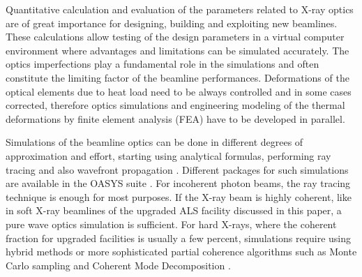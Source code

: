 \documentclass[preprint]{iucr}              %
\begin{document}
Quantitative calculation and evaluation of the parameters related to X-ray optics are of great importance for designing, building and exploiting new beamlines. These calculations allow testing of the design parameters in a virtual computer environment where advantages and limitations can be simulated accurately. The optics imperfections play a fundamental role in the simulations and often constitute the limiting factor of the beamline performances. Deformations of the optical elements due to heat load need to be always controlled and in some cases corrected, therefore optics simulations and engineering modeling of the thermal deformations by finite element analysis (FEA) have to be developed in parallel. 

Simulations of the beamline optics can be done in different degrees of approximation and effort, starting using analytical formulas, performing ray tracing and also wavefront propagation \cite{hyerarchical}. Different packages for such simulations are available in the OASYS suite \cite{codeOASYS}. For incoherent photon beams, the ray tracing technique is enough for most purposes. If the X-ray beam is highly coherent, like in soft X-ray beamlines of the upgraded ALS facility discussed in this paper, a pure wave optics simulation is sufficient. For 
hard X-rays, where the coherent fraction for upgraded facilities is usually a few percent, simulations require using hybrid methods \cite{hybrid} or more sophisticated partial coherence algorithms such as Monte Carlo sampling \cite{Chubar2011b} and Coherent Mode Decomposition \cite{codeCOMSYL}. 
\end{document}
